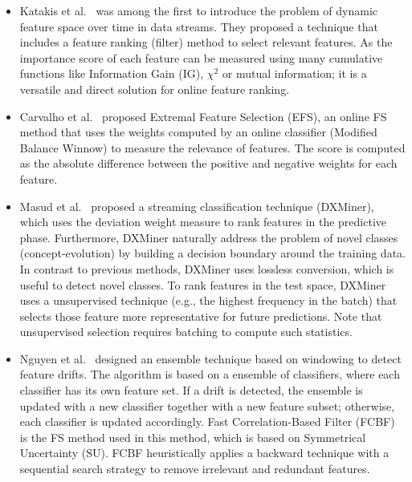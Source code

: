 \documentclass[preprint,12pt]{elsarticle}
\begin{document}
\begin{itemize}
	\item Katakis et al.~\cite{kata05} was among the first to introduce the problem of dynamic feature space over time in data streams. They proposed a technique that includes a feature ranking (filter) method to select relevant features. As the importance score of each feature can be measured using many cumulative functions like Information Gain (IG), $\chi^2$ or mutual information; it is a versatile and direct solution for online feature ranking.
	\item Carvalho et al.~\cite{carva06} proposed Extremal Feature Selection (EFS), an online FS method that uses the weights computed by an online classifier (Modified Balance Winnow) to measure the relevance of features. The score is computed as the absolute difference between the positive and negative weights for each feature.
	\item Masud et al.~\cite{masud10} proposed a streaming classification technique (DXMiner), which uses the deviation weight measure to rank features in the predictive phase. Furthermore, DXMiner naturally address the problem of novel classes (concept-evolution) by building a decision boundary around the training data. In contrast to previous methods, DXMiner uses lossless conversion, which is useful to detect novel classes. To rank features in the test space, DXMiner uses a unsupervised technique (e.g., the highest frequency in the batch) that selects those feature more representative for future predictions. Note that unsupervised selection requires batching to compute such statistics.
	\item Nguyen et al.~\cite{nguyen12} designed an ensemble technique based on windowing to detect feature drifts. The algorithm is based on a ensemble of classifiers, where each classifier has its own feature set. If a drift is detected, the ensemble is updated with a new classifier together with a new feature subset; otherwise, each classifier is updated accordingly. Fast Correlation-Based Filter (FCBF) is the FS method used in this method, which is based on Symmetrical Uncertainty (SU). FCBF heuristically applies a backward technique with a sequential search strategy to remove irrelevant and redundant features.

\end{itemize}
\end{document}
